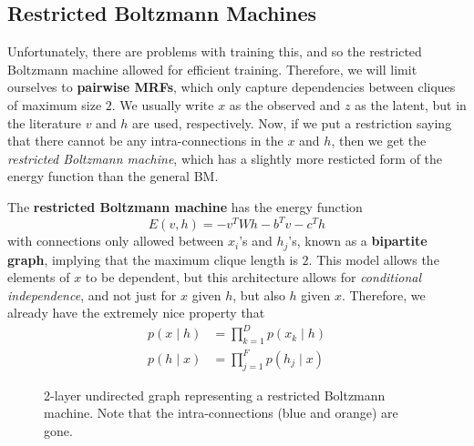 \subsection{Restricted Boltzmann Machines} 

  Unfortunately, there are problems with training this, and so the restricted Boltzmann machine allowed for efficient training. Therefore, we will limit ourselves to \textbf{pairwise MRFs}, which only capture dependencies between cliques of maximum size $2$. We usually write $x$ as the observed and $z$ as the latent, but in the literature $v$ and $h$ are used, respectively. Now, if we put a restriction saying that there cannot be any intra-connections in the $x$ and $h$, then we get the \textit{restricted Boltzmann machine}, which has a slightly more resticted form of the energy function than the general BM. 

  \begin{definition} 
    The \textbf{restricted Boltzmann machine} has the energy function 
    \begin{equation}
      E(v, h) = - v^T W h - b^T v - c^T h
    \end{equation}
    with connections only allowed between $x_i$'s and $h_j$'s, known as a \textbf{bipartite graph}, implying that the maximum clique length is $2$. This model allows the elements of $x$ to be dependent, but this architecture allows for \textit{conditional independence}, and not just for $x$ given $h$, but also $h$ given $x$. Therefore, we already have the extremely nice property that 
    \begin{align} 
      p(x \mid h) & = \prod_{k=1}^{D} p(x_k \mid h) \\
      p(h \mid x) & = \prod_{j=1}^F p(h_j \mid x) 
    \end{align}

    \begin{figure}[H]
      \centering 
      \caption{2-layer undirected graph representing a restricted Boltzmann machine. Note that the intra-connections (blue and orange) are gone. } 
      \label{fig:rbm}
    \end{figure}
  \end{definition}

